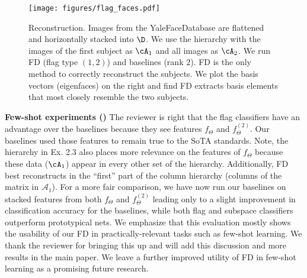 \documentclass[10pt,twocolumn,letterpaper]{article}
\begin{document}
\begin{figure}[t!]
    \centering
    \texttt{[image: figures/flag\_faces.pdf]}
    \vspace{-6mm}
    \caption{Reconstruction. Images from the YaleFaceDatabase are flattened and horizontally stacked into $\D$. We use the hierarchy with the images of the first subject as $\cA_1$ and all images as $\cA_2$. We run FD (flag type $(1,2)$) and baselines (rank $2$). FD is the only method to correctly reconstruct the subjects. We plot the basis vectors (eigenfaces) on the right and find FD extracts basis elements that most closely resemble the two subjects.}
    \vspace{-6mm}
    \label{fig:flag cartoon2}
\end{figure}
\noindent \textbf{Few-shot experiments (\Rtwo)}
The reviewer is right that the flag classifiers have an advantage over the baselines because they see features $f_{\Theta}$ and $f_{\Theta}^{(2)}$. Our baselines used those features to remain true to the SoTA standards.
Note, the hierarchy in Ex. 2.3 also places more relevance on the features of $f_{\Theta}$ because these data ($\cA_1$) appear in every other set of the hierarchy. Additionally, FD best reconstructs in the ``first'' part of the column hierarchy (columns of the matrix in $\mathcal{A}_1$).
For a more fair comparison, we have now run our baselines on stacked features from both $f_{\Theta}$ and $f_{\Theta}^{(2)}$ leading only to a slight improvement in classification accuracy for the baselines, while both flag and subspace classifiers outperform prototypical nets.
We emphasize that this evaluation mostly shows the usability of our FD in practically-relevant tasks such as few-shot learning. We thank the reviewer for bringing this up and will add this discussion and more results in the main paper. We leave a further improved utility of FD in few-shot learning as a promising future research.

\end{document}
